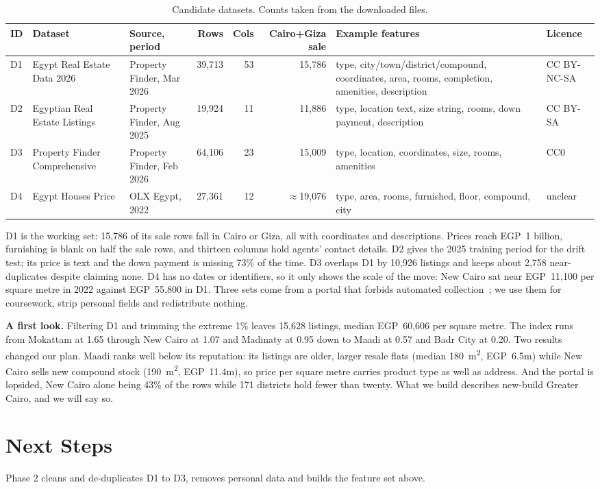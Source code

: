 \documentclass[sigconf,nonacm,10pt]{acmart}
\begin{document}
\begin{table}[t]
\caption{Candidate datasets. Counts taken from the downloaded files.}
\label{tab:data}
\small
\begin{tabularx}{\textwidth}{@{}p{0.4cm}p{2.7cm}p{2.1cm}rrrXp{1.7cm}@{}}
\toprule
ID & Dataset & Source, period & Rows & Cols & Cairo+Giza sale & Example features & Licence \\
\midrule
D1 & Egypt Real Estate Data 2026~\cite{ds_2026pf} & Property Finder, Mar 2026 & 39,713 & 53 & 15,786 & type, city/town/district/compound, coordinates, area, rooms, completion, amenities, description & CC BY-NC-SA \\
D2 & Egyptian Real Estate Listings~\cite{ds_2025pf} & Property Finder, Aug 2025 & 19,924 & 11 & 11,886 & type, location text, size string, rooms, down payment, description & CC BY-SA \\
D3 & Property Finder Comprehensive~\cite{ds_2026pfc} & Property Finder, Feb 2026 & 64,106 & 23 & 15,009 & type, location, coordinates, size, rooms, amenities & CC0 \\
D4 & Egypt Houses Price~\cite{ds_2022olx} & OLX Egypt, 2022 & 27,361 & 12 & $\approx$19,076 & type, area, rooms, furnished, floor, compound, city & unclear \\
\bottomrule
\end{tabularx}
\end{table}

D1 is the working set: 15,786 of its sale rows fall in Cairo or Giza, all with coordinates and descriptions. Prices reach EGP~1 billion, furnishing is blank on half the sale rows, and thirteen columns hold agents' contact details. D2 gives the 2025 training period for the drift test; its price is text and the down payment is missing 73\% of the time. D3 overlaps D1 by 10,926 listings and keeps about 2,758 near-duplicates despite claiming none. D4 has no dates or identifiers, so it only shows the scale of the move: New Cairo sat near EGP~11,100 per square metre in 2022 against EGP~55,800 in D1. Three sets come from a portal that forbids automated collection~\cite{pf_terms}; we use them for coursework, strip personal fields and redistribute nothing.

\textbf{A first look.} Filtering D1 and trimming the extreme 1\% leaves 15,628 listings, median EGP~60,606 per square metre. The index runs from Mokattam at 1.65 through New Cairo at 1.07 and Madinaty at 0.95 down to Maadi at 0.57 and Badr City at 0.20. Two results changed our plan. Maadi ranks well below its reputation: its listings are older, larger resale flats (median 180~m\textsuperscript{2}, EGP~6.5m) while New Cairo sells new compound stock (190~m\textsuperscript{2}, EGP~11.4m), so price per square metre carries product type as well as address. And the portal is lopsided, New Cairo alone being 43\% of the rows while 171 districts hold fewer than twenty. What we build describes new-build Greater Cairo, and we will say so.

\section{Next Steps}
Phase 2 cleans and de-duplicates D1 to D3, removes personal data and builds the feature set above.



\end{document}
